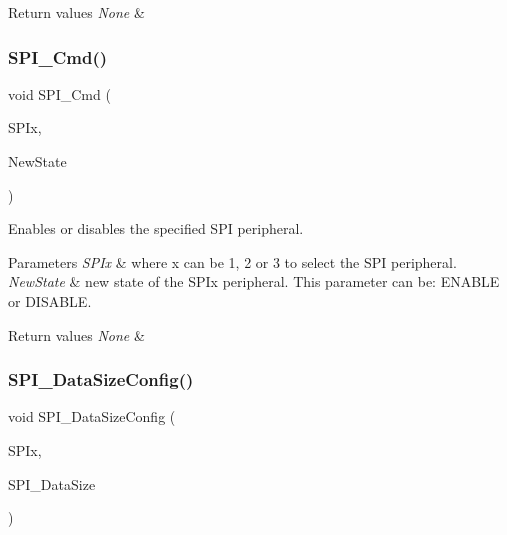 \begin{DoxyRetVals}{Return values}
{\em None} & \\
\hline
\end{DoxyRetVals}
\mbox{\label{group___s_p_i___private___functions_gaa31357879a65ee1ed7223f3b9114dcf3}} 
\subsubsection{\texorpdfstring{SPI\_Cmd()}{SPI\_Cmd()}}
{\footnotesize\ttfamily void S\+P\+I\+\_\+\+Cmd (\begin{DoxyParamCaption}\item[{\mbox{\hyperlink{struct_s_p_i___type_def}{S\+P\+I\+\_\+\+Type\+Def}} $\ast$}]{S\+P\+Ix,  }\item[{\mbox{\hyperlink{group___exported__types_gac9a7e9a35d2513ec15c3b537aaa4fba1}{Functional\+State}}}]{New\+State }\end{DoxyParamCaption})}



Enables or disables the specified S\+PI peripheral. 


\begin{DoxyParams}{Parameters}
{\em S\+P\+Ix} & where x can be 1, 2 or 3 to select the S\+PI peripheral. \\
\hline
{\em New\+State} & new state of the S\+P\+Ix peripheral. This parameter can be\+: E\+N\+A\+B\+LE or D\+I\+S\+A\+B\+LE. \\
\hline
\end{DoxyParams}

\begin{DoxyRetVals}{Return values}
{\em None} & \\
\hline
\end{DoxyRetVals}
\mbox{\label{group___s_p_i___private___functions_gafc82e90841d7879535d655c035709cb1}} 
\subsubsection{\texorpdfstring{SPI\_DataSizeConfig()}{SPI\_DataSizeConfig()}}
{\footnotesize\ttfamily void S\+P\+I\+\_\+\+Data\+Size\+Config (\begin{DoxyParamCaption}\item[{\mbox{\hyperlink{struct_s_p_i___type_def}{S\+P\+I\+\_\+\+Type\+Def}} $\ast$}]{S\+P\+Ix,  }\item[{uint16\+\_\+t}]{S\+P\+I\+\_\+\+Data\+Size }\end{DoxyParamCaption})}



